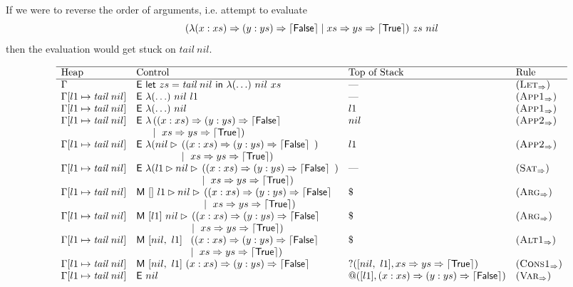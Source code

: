 If we were to reverse the order of arguments, i.e.\@
attempt to evaluate
\[
   (\lambda(x : xs) \Rightarrow (y : ys) \Rightarrow \left\lceil \textsf{False}\right\rceil \mid xs \Rightarrow ys \Rightarrow \left\lceil \textsf{True}\right\rceil)~zs~nil
\]
then the evaluation would get stuck on $tail~ nil$.


\begin{figure*}
  \[
    \begin{array}{llll}
      \hline
      \text{Heap}               & \text{Control}                                          & \text{Top of Stack}    & \text{Rule}            \\
      \hline
      \Gamma                    & \eval{\llet{zs = \tailNil}{\app{\app{\lambda(\ldots)}{nil}}{xs}}}   & \text{---}             & (\smallrule{Let})      \\
      \Gamma[l1\mapsto\tailNil] & \eval{\app{\app{\lambda(\ldots)}{nil}}{l1}}                           & \text{---}             & (\smallrule{App1})     \\
      \Gamma[l1\mapsto\tailNil] & \eval{\app{\lambda(\ldots)}{nil}}                                     & l1                     & (\smallrule{App1})     \\
      \Gamma[l1\mapsto\tailNil] & \eval{\lambda\!\!\lazyBody}                                         & nil                    & (\smallrule{App2})     \\
      \Gamma[l1\mapsto\tailNil] & \eval{\abstr{(\matcharg{nil}{\!\!\lazyBody})}}                & l1                     & (\smallrule{App2})     \\
      \Gamma[l1\mapsto\tailNil] & \eval{\abstr{(\matcharg{l1}{\matcharg{nil}{\!\!\lazyBody}})}} & \text{---}             & (\smallrule{Sat})      \\
      \Gamma[l1\mapsto\tailNil] & \match{[]}{\matcharg{l1}{\matcharg{nil}{\!\!\lazyBody}}}    & \$                     & (\smallrule{Arg})      \\
      \Gamma[l1\mapsto\tailNil] & \match{[l1]}{\matcharg{nil}{\!\!\lazyBody}}                 & \$                     & (\smallrule{Arg})      \\
      \Gamma[l1\mapsto\tailNil] & \match{[nil,~l1]}{\lazyBody}                            & \$                     & (\smallrule{Alt1})     \\
      \Gamma[l1\mapsto\tailNil] & \match{[nil,~l1]}{\lazyFalse}                           & ?([nil,~l1],\lazyTrue) & (\smallrule{Cons1})    \\
      \Gamma[l1\mapsto\tailNil] & \eval{nil}                                              & @([l1],\lazyFalse)     & (\smallrule{Var})      \\

\end{array}\]
\end{figure*}
